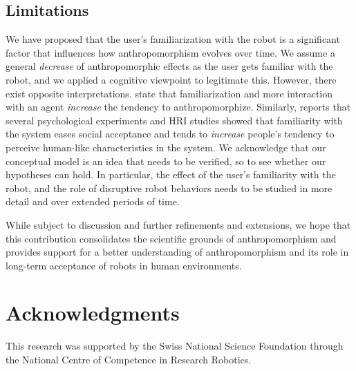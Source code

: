 \documentclass{frontiersSCNS} %
\begin{document}
\subsection{Limitations}

We have proposed that the user's familiarization with the robot is a significant factor that influences how anthropomorphism evolves over time. We assume a general \textit{decrease} of anthropomorphic effects as the user gets familiar with the robot, and we applied a cognitive viewpoint to legitimate this. However, there exist opposite interpretations. \cite{eddy_attribution_1993} state that familiarization and more interaction with an agent \textit{increase} the tendency to anthropomorphize. Similarly, \citep{duffy_anthropomorphism_2003} reports that several psychological experiments and HRI studies showed that familiarity with the system eases social acceptance and tends to \textit{increase} people's tendency to perceive human-like characteristics in the system.
We acknowledge that our conceptual model is an idea that needs to be verified, so to see whether our hypotheses can hold. In particular, the effect of the user's familiarity with the robot, and the role of disruptive robot behaviors needs to be studied in more detail and over extended periods of time.

While subject to discussion and further refinements and extensions, we hope that this contribution consolidates the scientific grounds of anthropomorphism and provides support for a better understanding of anthropomorphism and its role in long-term acceptance of robots in human environments.




\section*{Acknowledgments}

This research was supported by the Swiss National Science Foundation through the
National Centre of Competence in Research Robotics.

\end{document}
